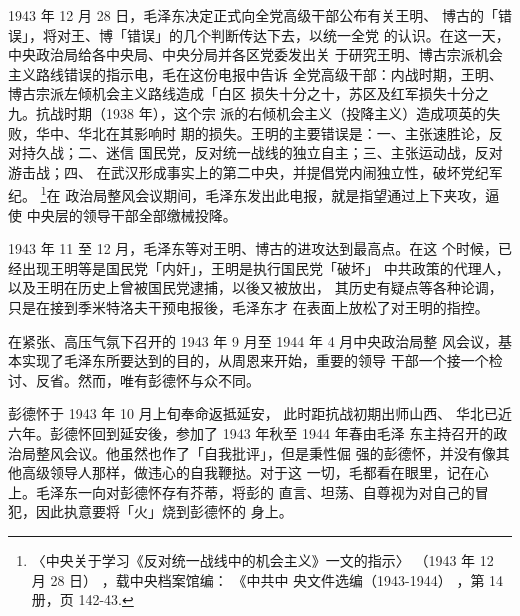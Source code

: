 1943 年 12 月 28 日，毛泽东决定正式向全党高级干部公布有关王明、
博古的「错误」，将对王、博「错误」的几个判断传达下去，以统一全党
的认识。在这一天，中央政治局给各中央局、中央分局并各区党委发出关
于研究王明、博古宗派机会主义路线错误的指示电，毛在这份电报中告诉
全党高级干部：内战时期，王明、博古宗派左倾机会主义路线造成「白区
损失十分之十，苏区及红军损失十分之九。抗战时期（1938 年），这个宗
派的右倾机会主义（投降主义）造成项英的失败，华中、华北在其影响时
期的损失。王明的主要错误是：一、主张速胜论，反对持久战；二、迷信
国民党，反对统一战线的独立自主；三、主张运动战，反对游击战；四、
在武汉形成事实上的第二中央，并提倡党内闹独立性，破坏党纪军纪。
\footnote{〈中央关于学习《反对统一战线中的机会主义》一文的指示〉
（1943 年 12 月 28 日）
，载中央档案馆编：
《中共中
央文件选编（1943-1944）
，第 14 册，页 142-43.}在
政治局整风会议期间，毛泽东发出此电报，就是指望通过上下夹攻，逼使
中央层的领导干部全部缴械投降。

1943 年 11 至 12 月，毛泽东等对王明、博古的进攻达到最高点。在这
个时候，已经出现王明等是国民党「内奸」，王明是执行国民党「破坏」
中共政策的代理人，以及王明在历史上曾被国民党逮捕，以後又被放出，
其历史有疑点等各种论调，只是在接到季米特洛夫干预电报後，毛泽东才
在表面上放松了对王明的指控。
 
在紧张、高压气氛下召开的 1943 年 9 月至 1944 年 4 月中央政治局整
风会议，基本实现了毛泽东所要达到的目的，从周恩来开始，重要的领导
干部一个接一个检讨、反省。然而，唯有彭德怀与众不同。
 
彭德怀于 1943 年 10 月上旬奉命返抵延安，
此时距抗战初期出师山西、
华北已近六年。彭德怀回到延安後，参加了 1943 年秋至 1944 年春由毛泽
东主持召开的政治局整风会议。他虽然也作了「自我批评」，但是秉性倔
强的彭德怀，并没有像其他高级领导人那样，做违心的自我鞭挞。对于这
一切，毛都看在眼里，记在心上。毛泽东一向对彭德怀存有芥蒂，将彭的
直言、坦荡、自尊视为对自己的冒犯，因此执意要将「火」烧到彭德怀的
身上。

